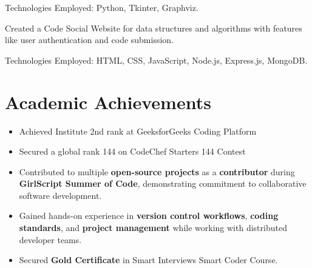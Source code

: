 \documentclass[]{deedy-resume-openfont}
\begin{document}
\begin{minipage}[t]{0.66\textwidth}
\begin{normalsize}
\begin{tightemize}
    \item Technologies Employed: Python, Tkinter, Graphviz.
\end{tightemize}
\end{normalsize}
\sectionsep

\begin{normalsize} %
\begin{tightemize}
    \item Created a Code Social Website for data structures and algorithms with features like user authentication and code submission.
    
    \item Technologies Employed: HTML, CSS, JavaScript, Node.js, Express.js, MongoDB.
\end{tightemize}
\end{normalsize}
\sectionsep





\section{Academic Achievements} 
\begin{normalsize} %
\begin{itemize}
    \item Achieved Institute 2nd rank at GeeksforGeeks Coding Platform
    \item Secured a global rank  144 on CodeChef Starters 144 Contest
    \item Contributed to multiple \textbf{open-source projects} as a \textbf{contributor} during \textbf{GirlScript Summer of Code}, demonstrating commitment to collaborative software development.  
    \item Gained hands-on experience in \textbf{version control workflows}, \textbf{coding standards}, and \textbf{project management} while working with distributed developer teams.
    \item Secured \textbf{Gold Certificate} in Smart Interviews Smart Coder Course.
  

\end{itemize}
\end{normalsize}


  

\end{minipage}
\end{document}
